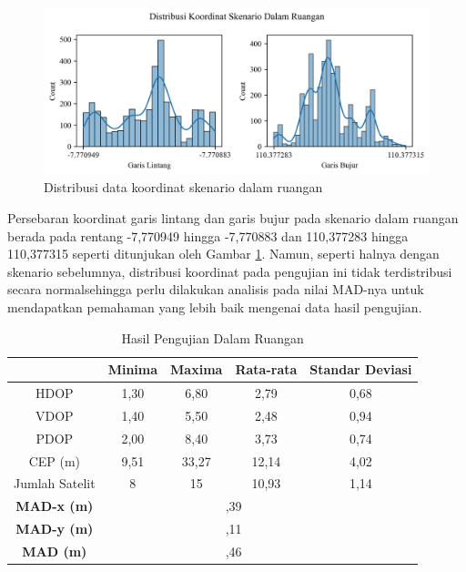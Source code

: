 \begin{figure}[H]
	\centering
	\begin{adjustbox}{width=\textwidth}
		\includegraphics{contents/chapter-4/2-skenario-indoor/distribution.png}
	\end{adjustbox}
	\caption{Distribusi data koordinat skenario dalam ruangan}
	\label{Fig:indoor-distribution}
\end{figure}

Persebaran koordinat garis lintang dan garis bujur pada skenario dalam ruangan berada pada rentang -7,770949 hingga -7,770883 dan 110,377283 hingga 110,377315 seperti ditunjukan oleh Gambar \ref{Fig:indoor-distribution}. Namun, seperti halnya dengan skenario sebelumnya, distribusi koordinat pada pengujian ini tidak terdistribusi secara normalsehingga perlu dilakukan analisis pada nilai MAD-nya untuk mendapatkan pemahaman yang lebih baik mengenai data hasil pengujian.

\begin{table}[H]
	\caption{Hasil Pengujian Dalam Ruangan}
	\vspace{0.5em}
	\centering
	\begin{tabular}{ccccc}
		\hline
		& \textbf{Minima} & \textbf{Maxima} & \textbf{Rata-rata} & \textbf{Standar Deviasi}\\
		\hline 
		HDOP & 1,30 & 6,80 & 2,79 & 0,68\\
		VDOP & 1,40 & 5,50 & 2,48 & 0,94\\
		PDOP & 2,00 & 8,40 & 3,73 & 0,74\\
		CEP (m) & 9,51	& 33,27 & 12,14 & 4,02\\
		Jumlah Satelit & 8 & 15 & 10,93 & 1,14\\
		\hline
		\textbf{MAD-x (m)} & & \multicolumn{2}{c}{\centering 7,39} & \\
		\hline
		\textbf{MAD-y (m)} & & \multicolumn{2}{c}{\centering 4,11} & \\
		\hline
		\textbf{MAD (m)} & & \multicolumn{2}{c}{\centering 8,46} & \\
		\hline
	\end{tabular}
	\label{Tab: indoor-table}
\end{table}

